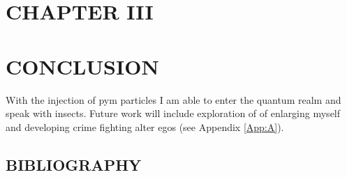 \documentclass[letterpaper]{article}
\begin{document}
\begin{flushleft}
{\begin{table}[ht]
\begin{tabular}{*{15}{c}}
\end{tabular}
\end{table}

\clearpage





























\section*{CHAPTER III}

\vspace{0.25in}
\section{CONCLUSION}
With the injection of pym particles I am able to enter the quantum realm and speak with insects. Future work will include exploration of of enlarging myself and developing crime fighting alter egos (see Appendix \ref{App:A}).

\newpage

\begin{center}
\vspace*{\fill}
\section*{\normalfont BIBLIOGRAPHY}
\vspace*{\fill}
\end{center}
\newpage
\let\oldaddcontentsline\addcontentsline%
\renewcommand{\addcontentsline}[3]{}%
\renewcommand\bibname{\normalfont BIBLIOGRAPHY}

\let\addcontentsline\oldaddcontentsline%

}
\end{flushleft}
\end{document}
